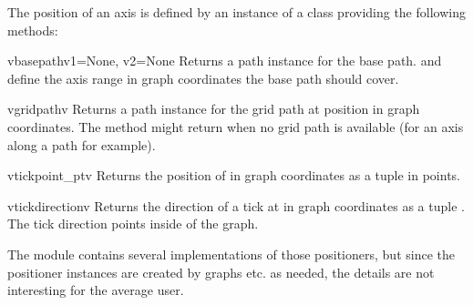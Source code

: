 
The position of an axis is defined by an instance of a class providing
the following methods:

\begin{methoddesc}{vbasepath}{v1=None, v2=None}
  Returns a path instance for the base path.  and 
  define the axis range in graph coordinates the base path should
  cover.
\end{methoddesc}

\begin{methoddesc}{vgridpath}{v}
  Returns a path instance for the grid path at position  in
  graph coordinates. The method might return  when no grid
  path is available (for an axis along a path for example).
\end{methoddesc}

\begin{methoddesc}{vtickpoint_pt}{v}
  Returns the position of  in graph coordinates as a tuple
   in points.
\end{methoddesc}

\begin{methoddesc}{vtickdirection}{v}
  Returns the direction of a tick at  in graph coordinates as a
  tuple . The tick direction points inside of the
  graph.
\end{methoddesc}

The module contains several implementations of those positioners, but
since the positioner instances are created by graphs etc. as needed,
the details are not interesting for the average \PyX{} user.


